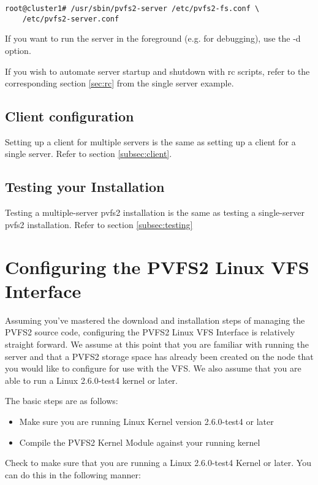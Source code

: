 \documentclass[11pt, letterpaper]{article}
\begin{document}
\begin{verbatim}
root@cluster1# /usr/sbin/pvfs2-server /etc/pvfs2-fs.conf \
	/etc/pvfs2-server.conf
\end{verbatim}

If you want to run the server in the foreground (e.g. for debugging), use the
-d option.

If you wish to automate server startup and shutdown with rc scripts, refer
to the corresponding section \ref{sec:rc} from the single server example.

\subsection{Client configuration}

Setting up a client for multiple servers is the same as setting up a client for a single server.  Refer to section \ref{subsec:client}.  

\subsection {Testing your Installation}

Testing a multiple-server pvfs2 installation is the same as testing a single-server pvfs2 installation.  Refer to section \ref{subsec:testing}

\section{Configuring the PVFS2 Linux VFS Interface}
\label{sec:vfs-configure}

Assuming you've mastered the download and installation steps of
managing the PVFS2 source code, configuring the PVFS2 Linux VFS
Interface is relatively straight forward.  We assume at this point
that you are familiar with running the server and that a PVFS2 storage
space has already been created on the node that you would like to
configure for use with the VFS.  We also assume that you are able to
run a Linux 2.6.0-test4 kernel or later.

The basic steps are as follows:
\begin{itemize}
\item Make sure you are running Linux Kernel version 2.6.0-test4 or
  later
\item Compile the PVFS2 Kernel Module against your running kernel
\end{itemize}

Check to make sure that you are running a Linux 2.6.0-test4 Kernel or
later.  You can do this in the following manner:
\end{document}
